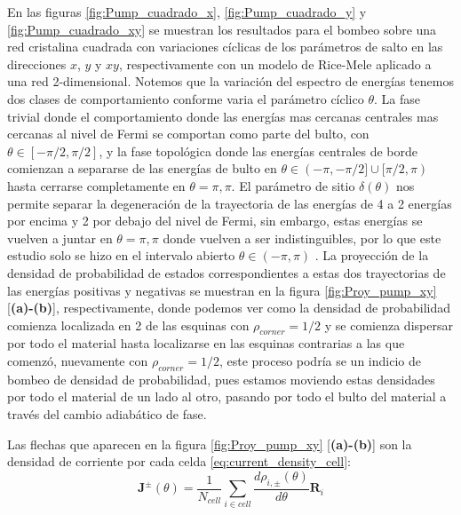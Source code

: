 En las figuras \ref{fig:Pump_cuadrado_x}, \ref{fig:Pump_cuadrado_y} y \ref{fig:Pump_cuadrado_xy} se muestran los resultados para el bombeo sobre una red cristalina cuadrada con variaciones cíclicas de los parámetros de salto en las direcciones $x$, $y$ y $xy$, respectivamente con un modelo de Rice-Mele aplicado a una red 2-dimensional. Notemos que la variación del espectro de energías tenemos dos clases de comportamiento conforme varia el parámetro cíclico $\theta$. La fase trivial donde el comportamiento donde las energías mas cercanas centrales mas cercanas al nivel de Fermi se comportan como parte del bulto, con $\theta \in [-\pi/2, \pi/2]$, y la fase topológica donde las energías centrales de borde comienzan a separarse de las energías de bulto en $\theta \in (-\pi,-\pi/2] \cup [\pi/2,\pi)$ hasta cerrarse completamente en $\theta = \pi,\pi$. El parámetro de sitio $\delta(\theta)$ nos permite separar la degeneración de la trayectoria de las energías de 4 a 2 energías por encima y 2 por debajo del nivel de Fermi, sin embargo, estas energías se vuelven a juntar en $\theta = \pi,\pi$ donde vuelven a ser indistinguibles, por lo que este estudio solo se hizo en el intervalo abierto $\theta \in (-\pi,\pi)$ . 
La proyección de la densidad de probabilidad de estados correspondientes a estas dos trayectorias de las energías positivas y negativas se muestran en la figura \ref{fig:Proy_pump_xy} [\textbf{(a)-(b)}], respectivamente, donde podemos ver como la densidad de probabilidad comienza localizada en 2 de las esquinas con $\rho_{corner} = 1/2$ y se comienza dispersar por todo el material hasta localizarse en las esquinas contrarias a las que comenzó, nuevamente con $\rho_{corner} = 1/2$, este proceso podría se un indicio de bombeo de densidad de probabilidad, pues estamos moviendo estas densidades por todo el material de un lado al otro, pasando por todo el bulto del material a través del cambio adiabático de fase. 

Las flechas que aparecen en la figura \ref{fig:Proy_pump_xy} [\textbf{(a)-(b)}] son la densidad de corriente por cada celda \ref{eq:current_density_cell}:
\begin{equation}
    \label{eq:current_density_cell}
    \mathbf{J}^{\pm}(\theta) = \frac{1}{N_{cell}}\sum_{i \in cell} \frac{d \rho_{i,\pm}(\theta)}{d\theta} \mathbf{R}_i  
\end{equation}

